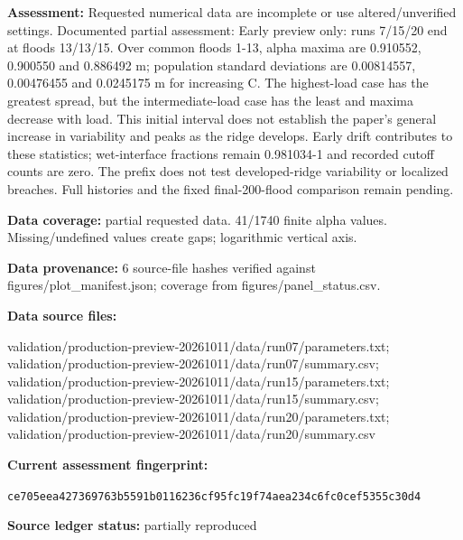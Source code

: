 \textbf{Assessment:} Requested numerical data are incomplete or use altered/\allowbreak{}unverified settings. Documented partial assessment: Early preview only: runs 7/\allowbreak{}15/\allowbreak{}20 end at floods 13/\allowbreak{}13/\allowbreak{}15. Over common floods 1-13, alpha maxima are 0.910552, 0.900550 and 0.886492 m; population standard deviations are 0.00814557, 0.00476455 and 0.0245175 m for increasing C. The highest-load case has the greatest spread, but the intermediate-load case has the least and maxima decrease with load. This initial interval does not establish the paper's general increase in variability and peaks as the ridge develops. Early drift contributes to these statistics; wet-interface fractions remain 0.981034-1 and recorded cutoff counts are zero. The prefix does not test developed-ridge variability or localized breaches. Full histories and the fixed final-200-flood comparison remain pending.

\textbf{Data coverage:} partial requested data. 41/\allowbreak{}1740 finite alpha values. Missing/\allowbreak{}undefined values create gaps; logarithmic vertical axis.

\textbf{Data provenance:} 6 source-file hashes verified against figures/\allowbreak{}plot\_\allowbreak{}manifest.json; coverage from figures/\allowbreak{}panel\_\allowbreak{}status.csv.

\textbf{Data source files:}\par {\small\raggedright validation/\allowbreak{}production-preview-20261011/\allowbreak{}data/\allowbreak{}run07/\allowbreak{}parameters.txt; validation/\allowbreak{}production-preview-20261011/\allowbreak{}data/\allowbreak{}run07/\allowbreak{}summary.csv; validation/\allowbreak{}production-preview-20261011/\allowbreak{}data/\allowbreak{}run15/\allowbreak{}parameters.txt; validation/\allowbreak{}production-preview-20261011/\allowbreak{}data/\allowbreak{}run15/\allowbreak{}summary.csv; validation/\allowbreak{}production-preview-20261011/\allowbreak{}data/\allowbreak{}run20/\allowbreak{}parameters.txt; validation/\allowbreak{}production-preview-20261011/\allowbreak{}data/\allowbreak{}run20/\allowbreak{}summary.csv\par}

\textbf{Current assessment fingerprint:}\par {\small\texttt{ce705eea427369763b5591b0116236cf95fc19f74aea234c6fc0cef5355c30d4}}\par

\textbf{Source ledger status:} partially reproduced

